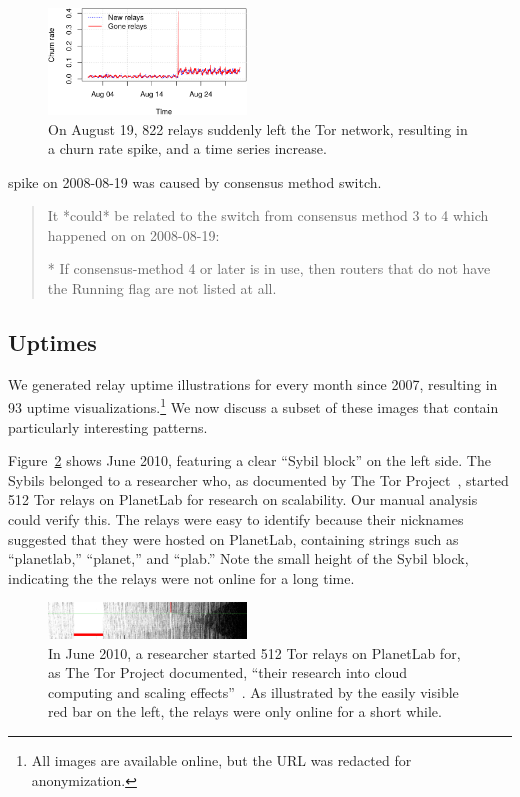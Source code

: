 \begin{figure}[t]
	\centering
	\includegraphics[width=0.47\textwidth]{diagrams/2008-08.pdf}
	\caption{On August 19, 822 relays suddenly left the Tor network, resulting
	in a churn rate spike, and a time series increase.}
	\label{fig:2008-08}
\end{figure}

spike on 2008-08-19 was caused by consensus method switch.
\begin{quote}
It *could* be related to the switch from consensus method 3 to 4 which happened
on on 2008-08-19:

        * If consensus-method 4 or later is in use, then routers that
          do not have the Running flag are not listed at all.
\end{quote}

\subsection{Uptimes}
We generated relay uptime illustrations for every month since 2007, resulting in
93 uptime visualizations.\footnote{All images are available online, but the URL
was redacted for anonymization.}  We now discuss a subset of these images that
contain particularly interesting patterns.

Figure~\ref{fig:2010-06-planetlab} shows June 2010, featuring a clear ``Sybil
block'' on the left side.  The Sybils belonged to a researcher who, as
documented by The Tor Project~\cite{progressreport}, started 512 Tor relays on
PlanetLab for research on scalability.  Our manual analysis could verify this.
The relays were easy to identify because their nicknames suggested that they
were hosted on PlanetLab, containing strings such as ``planetlab,'' ``planet,''
and ``plab.''  Note the small height of the Sybil block, indicating the the
relays were not online for a long time.

\begin{figure}[t]
	\centering
	\includegraphics[width=0.47\textwidth]{diagrams/planetlab-uptimes.jpg}
	\caption{In June 2010, a researcher started 512 Tor relays on PlanetLab for,
		as The Tor Project documented, ``their research into cloud computing and
		scaling effects''~\cite{progressreport}.  As illustrated by the easily
		visible red bar on the left, the relays were only online for a short
		while.}
	\label{fig:2010-06-planetlab}
\end{figure}

